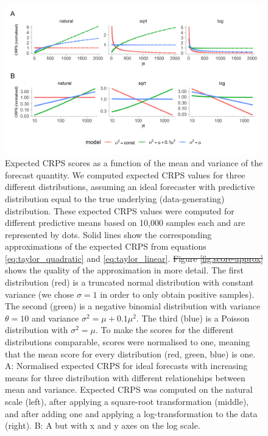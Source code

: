 \documentclass[10pt,letterpaper]{article} %
\providecommand{\DIFdeltex}[1]{{\protect\color{red}\sout{#1}}}                      %
\providecommand{\DIFdelFL}[1]{\DIFdel{#1}} %
\providecommand{\DIFaddbeginFL}{} %
\providecommand{\DIFaddendFL}{} %
\providecommand{\DIFdelbeginFL}{} %
\providecommand{\DIFdelendFL}{} %
\providecommand{\DIFdel}[1]{\texorpdfstring{\DIFdeltex{#1}}{}} %
\newcommand{\DIFscaledelfig}{0.5}
\newlength{\DIFdelgraphicswidth} %
\newlength{\DIFdelgraphicsheight} %
\newcommand{\DIFaddincludegraphics}[2][]{{\color{blue}\fbox{\DIFOincludegraphics[#1]{#2}}}} %
\newcommand{\DIFdelincludegraphics}[2][]{%
\sbox{\DIFdelgraphicsbox}{\DIFOincludegraphics[#1]{#2}}%
\settoboxwidth{\DIFdelgraphicswidth}{\DIFdelgraphicsbox} %
\settoboxtotalheight{\DIFdelgraphicsheight}{\DIFdelgraphicsbox} %
\scalebox{\DIFscaledelfig}{%
\parbox[b]{\DIFdelgraphicswidth}{\usebox{\DIFdelgraphicsbox}\\[-\baselineskip] \rule{\DIFdelgraphicswidth}{0em}}\llap{\resizebox{\DIFdelgraphicswidth}{\DIFdelgraphicsheight}{%
\setlength{\unitlength}{\DIFdelgraphicswidth}%
\begin{picture}(1,1)%
\thicklines\linethickness{2pt} %
{\color[rgb]{1,0,0}\put(0,0){\framebox(1,1){}}}%
{\color[rgb]{1,0,0}\put(0,0){\line( 1,1){1}}}%
{\color[rgb]{1,0,0}\put(0,1){\line(1,-1){1}}}%
\end{picture}%
}\hspace*{3pt}}} %
} %
\DeclareRobustCommand{\DIFaddbeginFL}{\DIFOaddbeginFL \let\includegraphics\DIFaddincludegraphics} %
\DeclareRobustCommand{\DIFaddendFL}{\DIFOaddendFL \let\includegraphics\DIFOincludegraphics} %
\DeclareRobustCommand{\DIFdelbeginFL}{\DIFOdelbeginFL \let\includegraphics\DIFdelincludegraphics} %
\DeclareRobustCommand{\DIFdelendFL}{\DIFOaddendFL \let\includegraphics\DIFOincludegraphics} %
\begin{document}
\begin{figure}[h!]
    \centering
    \includegraphics[width=0.99\textwidth]{../output/figures/SIM-mean-state-size.png}
    \caption{Expected CRPS scores as a function of the mean and variance of the forecast quantity. We computed expected CRPS values  for three different distributions, assuming an ideal forecaster with predictive distribution equal to the true underlying (data-generating) distribution. 
    These expected CRPS values were computed for different predictive means based on 10,000 samples each and are represented by dots. Solid lines show the corresponding approximations of the expected CRPS from equations \eqref{eq:taylor_quadratic} and \eqref{eq:taylor_linear}. \DIFdelbeginFL \DIFdelFL{Figure \ref{fig:score-approx} }\DIFdelendFL \DIFaddbeginFL {} \DIFaddendFL shows the quality of the approximation in more detail. 
    The first distribution (red) is a truncated normal distribution with constant variance (we chose $\sigma = 1$ in order to only obtain positive samples). The second (green) is a negative binomial distribution with variance $\theta = 10$ and variance $\sigma^2 = \mu + 0.1\mu^2$. The third (blue) is a
    Poisson distribution with $\sigma^2 = \mu$. To make the scores for the different distributions comparable, scores were normalised to one, meaning that the mean score for every distribution (red, green, blue) is one. 
    A: Normalised expected CRPS for ideal forecasts with increasing means for three distribution with different relationships between mean and variance. Expected CRPS was computed on the natural scale (left), after applying a square-root transformation (middle), and after adding one and applying a log-transformation to the data (right). B: A but with x and y axes on the log scale.}
    \label{fig:SIM-wis-state-size-mean}
\end{figure}
\end{document}
